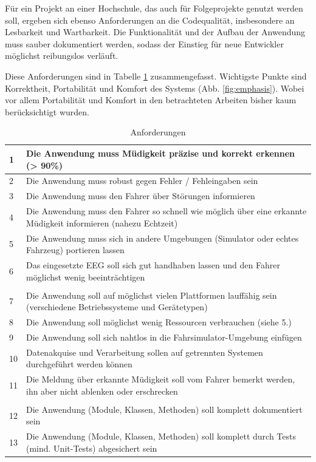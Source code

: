 Für ein Projekt an einer Hochschule, das auch für Folgeprojekte genutzt werden soll, ergeben sich ebenso Anforderungen an die Codequalität, insbesondere an Lesbarkeit und Wartbarkeit. Die Funktionalität und der Aufbau der Anwendung muss sauber dokumentiert werden, sodass der Einstieg für neue Entwickler möglichst reibungslos verläuft.

Diese Anforderungen sind in Tabelle \ref{tab:requirements} zusammengefasst. Wichtigste Punkte sind Korrektheit, Portabilität und Komfort des Systems (Abb. \ref{fig:emphasis}). Wobei vor allem Portabilität und Komfort in den betrachteten Arbeiten bisher kaum berücksichtigt wurden.

\begin{table}[t]
 \caption{Anforderungen}
 \renewcommand{\arraystretch}{2}
 \begin{tabularx}{\textwidth}{lX}
  1 & Die Anwendung muss Müdigkeit präzise und korrekt erkennen (> 90\%) \\ \hline
  2 & Die Anwendung muss robust gegen Fehler / Fehleingaben sein \\ \hline 
  3 & Die Anwendung muss den Fahrer über Störungen informieren \\ \hline
  4 & Die Anwendung muss den Fahrer so schnell wie möglich über eine erkannte Müdigkeit informieren (nahezu Echtzeit)\\ \hline
  5 & Die Anwendung muss sich in andere Umgebungen (Simulator oder echtes Fahrzeug) portieren lassen \\ \hline 
  6 & Das eingesetzte EEG soll sich gut handhaben lassen und den Fahrer möglichst wenig beeinträchtigen \\ \hline
  \\
  7 & Die Anwendung soll auf möglichst vielen Plattformen lauffähig sein  (verschiedene Betriebssysteme und Gerätetypen) \\ \hline
  8 & Die Anwendung soll möglichst wenig Ressourcen verbrauchen (siehe 5.) \\ \hline
  9 & Die Anwendung soll sich nahtlos in die Fahrsimulator-Umgebung einfügen \\ \hline
  10 & Datenakquise und Verarbeitung sollen auf getrennten Systemen durchgeführt werden können \\ \hline
  11 & Die Meldung über erkannte Müdigkeit soll vom Fahrer bemerkt werden, ihn aber nicht ablenken oder erschrecken \\ \hline
  \\
  12 & Die Anwendung (Module, Klassen, Methoden) soll komplett dokumentiert sein \\ \hline 
  13 & Die Anwendung (Module, Klassen, Methoden) soll komplett durch Tests (mind. Unit-Tests) abgesichert sein \\ \hline
 \end{tabularx}
 \label{tab:requirements}
\end{table}


